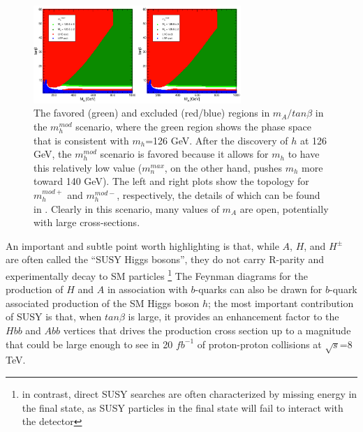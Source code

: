 \begin{figure}
	\centering
	\includegraphics[width=0.7\textwidth]{Theory/figures/mh_mod.pdf}
	\caption{The favored (green) and excluded (red/blue) regions in 
    $m_A/tan\beta$ in the $m_h^{mod}$ scenario, where the green 
    region shows the phase space that is consistent with $m_h$=126 GeV.  
    After the discovery of $h$ at 126 GeV, the $m_h^{mod}$ 
    scenario is favored because it allows for $m_h$ to have 
    this relatively low value ($m_n^{max}$, on the other 
    hand, pushes $m_h$ more toward 140 GeV).  The 
    left and right plots show the topology for $m_h^{mod+}$ 
    and $m_h^{mod-}$, respectively, the details of which 
    can be found in \cite{Carena-2}. Clearly in this 
    scenario, many values of $m_A$ are open, potentially with large cross-sections. \label{fig:mh_mod}}
\end{figure}





An important and subtle point worth highlighting is that, while 
$A$, $H$, and $H^\pm$ are often called the ``SUSY Higgs bosons'', 
they do not carry R-parity and experimentally decay to SM particles
\footnote{in contrast, direct SUSY searches are often characterized
by missing energy in the final state, as SUSY particles in the 
final state will fail to interact with the detector}
The Feynman diagrams for the production of $H$ and $A$ 
in association with $b$-quarks can also be drawn for 
$b$-quark associated production of the SM Higgs boson $h$; 
the most important contribution of SUSY is that, when $tan\beta$ 
is large, it provides an enhancement factor to the $Hbb$ and $Abb$ vertices that 
drives the production cross section up to a magnitude that could be 
large enough to see in 20 $fb^{-1}$ of proton-proton collisions at $\sqrt{s}$=8 TeV.

